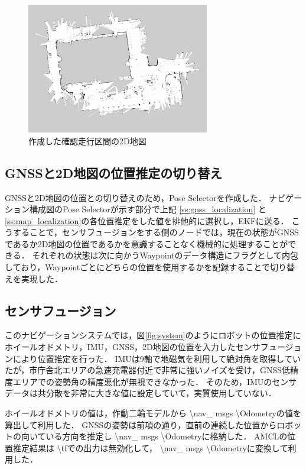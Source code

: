 \documentclass[platex,dvipdfmx]{rbproceedings}
\begin{document}
\begin{figure}[htbp]
    \centering   
    \includegraphics[keepaspectratio,width=80mm]{fig/map.png}
    \caption{作成した確認走行区間の2D地図}
    \label{fig:map}
\end{figure}

\subsection{GNSSと2D地図の位置推定の切り替え}
GNSSと2D地図の位置との切り替えのため，Pose Selectorを作成した．
ナビゲーション構成図のPose Selectorが示す部分で上記 \ref{ss:gnss_localization} と  \ref{ss:map_localization}の各位置推定をした値を排他的に選択し，EKFに送る．
こうすることで，センサフュージョンをする側のノードでは，現在の状態がGNSSであるか2D地図の位置であるかを意識することなく機械的に処理することができる．
それぞれの状態は次に向かうWaypointのデータ構造にフラグとして内包しており，Waypointごとにどちらの位置を使用するかを記録することで切り替えを実現した．


\subsection{センサフュージョン}\label{ss:sensor_fusion}
このナビゲーションシステムでは，図\ref{fig:system}のようにロボットの位置推定にホイールオドメトリ，IMU，GNSS，2D地図の位置を入力したセンサフュージョンにより位置推定を行った．
IMUは9軸で地磁気を利用して絶対角を取得していたが，市庁舎北エリアの急速充電器付近で非常に強いノイズを受け，GNSS低精度エリアでの姿勢角の精度悪化が無視できなかった．
そのため，IMUのセンサデータは共分散を非常に大きな値に設定していて，実質使用していない．

ホイールオドメトリの値は，作動二輪モデルから  \textbackslash nav\_ msgs \textbackslash Odometryの値を算出して利用した．
GNSSの姿勢は前項の通り，直前の連続した位置からロボットの向いている方向を推定し  \textbackslash nav\_ msgs \textbackslash Odometryに格納した．
AMCLの位置推定結果は \textbackslash tfでの出力は無効化して，  \textbackslash nav\_ msgs \textbackslash Odometryに変換して利用した．
\end{document}
